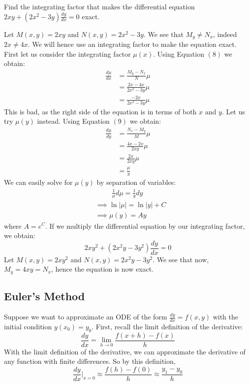\begin{example}
   Find the integrating factor that makes the differential equation $2xy + (2x^2 - 3y)\frac{dy}{dx} = 0$ exact. 
\end{example}
\begin{solution}
   Let $M(x,y) = 2xy$ and $N(x,y) = 2x^2 - 3y$. We see that $M_y \neq N_x$, indeed $2x \neq 4x$. We will hence use an integrating factor to make the equation exact. First let us consider the integrating factor $\mu(x)$. Using Equation $(8)$ we obtain:
   \begin{align*}
      \frac{d\mu}{dx} &= \frac{M_y - N_x}{N}\mu \\ 
                      &= \frac{2x - 4x}{2x^2 - 3y}\mu \\
                      &=   \frac{-2x}{2x^2 - 3y}\mu
   \end{align*}
   This is bad, as the right side of the equation is in terms of both $x$ and $y$. Let us try $\mu(y)$ instead. Using Equation $(9)$ we obtain:
   \begin{align*}
      \frac{d\mu}{dy} &= \frac{N_x - M_y}{M}\mu \\
                      &= \frac{4x - 2x}{2xy}\mu \\
                      &= \frac{2x}{2xy}\mu \\
                      &= \frac{\mu}{y}
   \end{align*}
   We can easily solve for $\mu(y)$ by separation of variables:
   \begin{align*}
      &\hspace{1cm} \frac{1}{\mu}d\mu = \frac{1}{y}dy \\
      &\implies \ln|\mu| = \ln|y| + C \\
      &\implies \mu(y) = Ay 
   \end{align*}
   where $A = e^C$. If we multiply the differential equation by our integrating factor, we obtain:
   \[ 2xy^2 + (2x^2y -3y^2)\frac{dy}{dx} = 0\]
   Let $M(x,y) = 2xy^2$ and $N(x,y) = 2x^2y - 3y^2$. We see that now, $M_y = 4xy = N_x$, hence the equation is now exact.  
\end{solution}

\subsection{Euler's Method}

Suppose we want to approximate an ODE of the form $\frac{dy}{dx} = f(x,y)$ with the initial condition $y(x_0) = y_0$. First, recall the limit definition of the derivative:
\[ \frac{dy}{dx} = \lim_{h \to 0} \frac{f(x+h) - f(x)}{h}\]
With the limit definition of the derivative, we can approximate the derivative of any function with finite differences. So by this definition, 
\[ \frac{dy}{dx}\bigg|_{x = 0} \approx \frac{f(h) - f(0)}{h} \approx \frac{y_1 - y_0}{h} \]

